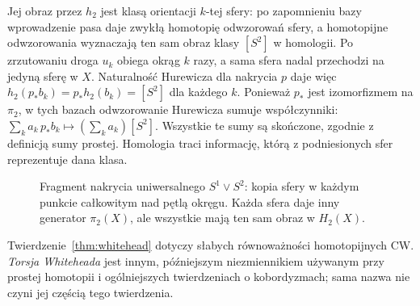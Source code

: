 \begin{przyklad}
Jej obraz przez $h_2$ jest klasą orientacji $k$-tej sfery:
po zapomnieniu bazy wprowadzenie pasa daje zwykłą homotopię
odwzorowań sfery, a homotopijne odwzorowania wyznaczają
ten sam obraz klasy $[S^2]$ w homologii.
Po zrzutowaniu droga $u_k$ obiega okrąg $k$ razy, a sama sfera
nadal przechodzi na jedyną sferę w $X$.
Naturalność Hurewicza dla nakrycia $p$ daje więc
$h_2(p_*b_k)=p_*h_2(b_k)=[S^2]$ dla każdego $k$.
Ponieważ $p_*$ jest izomorfizmem na $\pi_2$, w tych bazach
odwzorowanie Hurewicza sumuje współczynniki:
$\sum_k a_k\,p_*b_k\mapsto(\sum_k a_k)[S^2]$.
Wszystkie te sumy są skończone, zgodnie z definicją sumy prostej.
Homologia traci
informację, którą
z podniesionych
sfer reprezentuje
dana klasa.
\end{przyklad}

\begin{figure}[!htbp]
\centering
{}
\caption{Fragment nakrycia uniwersalnego
$S^1\vee S^2$: kopia sfery w każdym
punkcie całkowitym nad pętlą okręgu.
Każda sfera daje inny generator
$\pi_2(X)$, ale wszystkie mają
ten sam obraz w $H_2(X)$.}
\label{fig:nakrycie-bukiet-sfer}
\end{figure}

\begin{uwaga}
Twierdzenie~\ref{thm:whitehead}
dotyczy słabych równoważności
homotopijnych CW.
\emph{Torsja Whiteheada}
jest innym, późniejszym
niezmiennikiem używanym
przy prostej homotopii
i ogólniejszych
twierdzeniach o
kobordyzmach; sama
nazwa nie czyni jej
częścią tego twierdzenia.
\end{uwaga}

